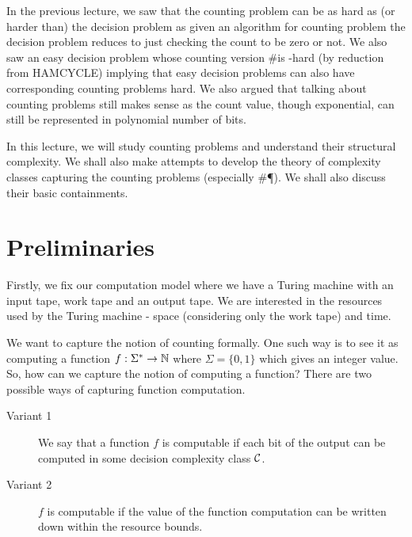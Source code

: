 

In the previous lecture, we saw that the counting problem can be as hard as (or 
harder than) the decision problem as given an algorithm for counting problem
the decision problem reduces to just checking the count to be zero or not. We
also saw an easy decision problem \CYCLE whose counting version \#\CYCLE is
\NP-hard (by reduction from {\sf HAMCYCLE}) implying that easy decision
problems can also have corresponding counting problems hard. We also argued
that talking about counting problems still makes sense as the count value,
though exponential, can still be represented in polynomial number of
bits.

In this lecture, we will study counting problems and understand their
structural complexity. We shall also make attempts to develop the theory of
complexity classes capturing the counting problems (especially \#\P). We shall
also discuss their basic containments.

\section{Preliminaries}
Firstly, we fix our computation model where we have a Turing machine with an
input tape, work tape and an output tape. We are interested in the resources
used by the Turing machine - space (considering only the work tape) and time.

We want to capture the notion of counting formally. One such way is to see it
as computing a function $f : \Sigma^* \to {\mathbb{N}}$ where $\Sigma=\{0,1\}$ which
gives an integer value. So, how can we capture the notion of computing a
function? There are two possible ways of capturing function computation.
\begin{description}
\item[Variant 1] We say that a function $f$ is computable if each bit of the
output can be computed in some decision complexity class ${\cal C}$.
\item[Variant 2] $f$ is computable if the value of the function computation
can be written down within the resource bounds.
\end{description}

